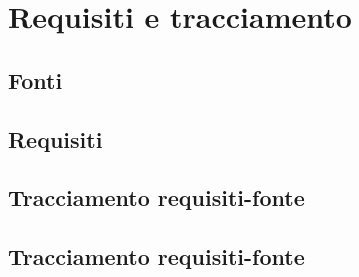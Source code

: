 \section{Requisiti e tracciamento}

\subsection{Fonti}


\subsection{Requisiti}


\subsection{Tracciamento requisiti-fonte}


\subsection{Tracciamento requisiti-fonte}
